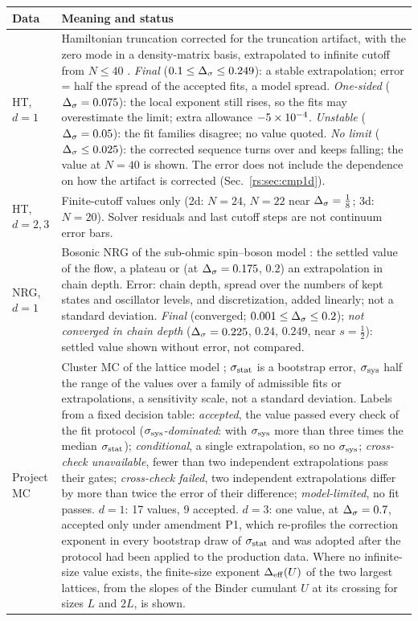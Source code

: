 \begin{table}[htbp]\centering\small
\begin{tabular}{@{}>{\raggedright\arraybackslash}p{}>{\raggedright\arraybackslash}p{}@{}}
\toprule
Data & Meaning and status\\ \midrule
HT, $d=1$ & Hamiltonian truncation corrected for the truncation artifact, with the zero mode in a density-matrix basis, extrapolated to infinite cutoff from $N\le40$ \cite{rs:noteHT}. \emph{Final} ($0.1\le\Delta_\sigma\le0.249$): a stable extrapolation; error = half the spread of the accepted fits, a model spread. \emph{One-sided} ($\Delta_\sigma=0.075$): the local exponent still rises, so the fits may overestimate the limit; extra allowance $-5\times10^{-4}$. \emph{Unstable} ($\Delta_\sigma=0.05$): the fit families disagree; no value quoted. \emph{No limit} ($\Delta_\sigma\le0.025$): the corrected sequence turns over and keeps falling; the value at $N=40$ is shown. The error does not include the dependence on how the artifact is corrected (Sec.~\ref{rs:sec:cmp1d}).\\
HT, $d=2,3$ & Finite-cutoff values only \cite{rs:noteHT} (2d: $N=24$, $N=22$ near $\Delta_\sigma=\frac18$; 3d: $N=20$). Solver residuals and last cutoff steps are not continuum error bars.\\
NRG, $d=1$ & Bosonic NRG of the sub-ohmic spin--boson model \cite{rs:noteNRG}: the settled value of the flow, a plateau or (at $\Delta_\sigma=0.175$, $0.2$) an extrapolation in chain depth. Error: chain depth, spread over the numbers of kept states and oscillator levels, and discretization, added linearly; not a standard deviation. \emph{Final} (converged; $0.001\le\Delta_\sigma\le0.2$); \emph{not converged in chain depth} ($\Delta_\sigma=0.225$, $0.24$, $0.249$, near $s=\frac12$): settled value shown without error, not compared.\\
Project MC & Cluster MC of the lattice model \cite{rs:noteMC}; $\sigma_{\rm stat}$ is a bootstrap error, $\sigma_{\rm sys}$ half the range of the values over a family of admissible fits or extrapolations, a sensitivity scale, not a standard deviation. Labels from a fixed decision table: \emph{accepted}, the value passed every check of the fit protocol (\emph{$\sigma_{\rm sys}$-dominated}: with $\sigma_{\rm sys}$ more than three times the median $\sigma_{\rm stat}$); \emph{conditional}, a single extrapolation, so no $\sigma_{\rm sys}$; \emph{cross-check unavailable}, fewer than two independent extrapolations pass their gates; \emph{cross-check failed}, two independent extrapolations differ by more than twice the error of their difference; \emph{model-limited}, no fit passes. $d=1$: 17 values, 9 accepted. $d=3$: one value, at $\Delta_\sigma=0.7$, accepted only under amendment P1, which re-profiles the correction exponent in every bootstrap draw of $\sigma_{\rm stat}$ and was adopted after the protocol had been applied to the production data. Where no infinite-size value exists, the finite-size exponent $\Delta_{\rm eff}(U)$ of the two largest lattices, from the slopes of the Binder cumulant $U$ at its crossing for sizes $L$ and $2L$, is shown.\\

\end{tabular}
\end{table}
